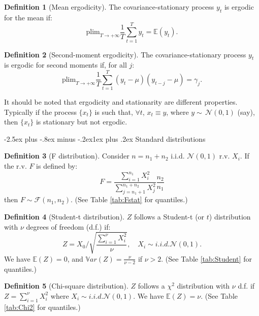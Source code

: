 \documentclass[
  11pt,
]{book}
\makeatletter
\renewcommand\subsection{\@startsection{subsection}{2}{\z@}
  {-2.5ex plus -.8ex minus -.2ex}{1ex plus .2ex}
  {\normalfont\large\bfseries\color{TextbookInk}}}
\theoremstyle{definition}
\newtheorem{definition}{Definition}[chapter]
\theoremstyle{definition}
\theoremstyle{definition}
\theoremstyle{definition}
\theoremstyle{remark}
\makeatother
\begin{document}
\begin{definition}[Mean ergodicity]
\protect\hypertarget{def:ergodicity}{}\label{def:ergodicity}The covariance-stationary process \(y_t\) is ergodic for the mean if:
\[
\mbox{plim}_{T \rightarrow +\infty} \frac{1}{T}\sum_{t=1}^T y_t = \mathbb{E}(y_t).
\]
\end{definition}

\begin{definition}[Second-moment ergodicity]
\protect\hypertarget{def:ergod2nd}{}\label{def:ergod2nd}The covariance-stationary process \(y_t\) is ergodic for second moments if, for all \(j\):
\[
\mbox{plim}_{T \rightarrow +\infty} \frac{1}{T}\sum_{t=1}^T (y_t-\mu) (y_{t-j}-\mu) = \gamma_j.
\]
\end{definition}

It should be noted that ergodicity and stationarity are different properties. Typically if the process \(\{x_t\}\) is such that, \(\forall t\), \(x_t \equiv y\), where \(y \sim\,\mathcal{N}(0,1)\) (say), then \(\{x_t\}\) is stationary but not ergodic.

\subsection{Standard distributions}\label{standard-distributions}

\begin{definition}[F distribution]
\protect\hypertarget{def:fstatistics}{}\label{def:fstatistics}Consider \(n=n_1+n_2\) i.i.d. \(\mathcal{N}(0,1)\) r.v. \(X_i\). If the r.v. \(F\) is defined by:
\[
F = \frac{\sum_{i=1}^{n_1} X_i^2}{\sum_{j=n_1+1}^{n_1+n_2} X_j^2}\frac{n_2}{n_1}
\]
then \(F \sim \mathcal{F}(n_1,n_2)\). (See Table \ref{tab:Fstat} for quantiles.)
\end{definition}

\begin{definition}[Student-t distribution]
\protect\hypertarget{def:tStudent}{}\label{def:tStudent}\(Z\) follows a Student-t (or \(t\)) distribution with \(\nu\) degrees of freedom (d.f.) if:
\[
Z = X_0 \bigg/ \sqrt{\frac{\sum_{i=1}^{\nu}X_i^2}{\nu}}, \quad X_i \sim i.i.d. \mathcal{N}(0,1).
\]
We have \(\mathbb{E}(Z)=0\), and \(\mathbb{V}ar(Z)=\frac{\nu}{\nu-2}\) if \(\nu>2\). (See Table \ref{tab:Student} for quantiles.)
\end{definition}

\begin{definition}[Chi-square distribution]
\protect\hypertarget{def:chi2}{}\label{def:chi2}\(Z\) follows a \(\chi^2\) distribution with \(\nu\) d.f. if \(Z = \sum_{i=1}^{\nu}X_i^2\) where \(X_i \sim i.i.d. \mathcal{N}(0,1)\).
We have \(\mathbb{E}(Z)=\nu\). (See Table \ref{tab:Chi2} for quantiles.)
\end{definition}
\end{document}
